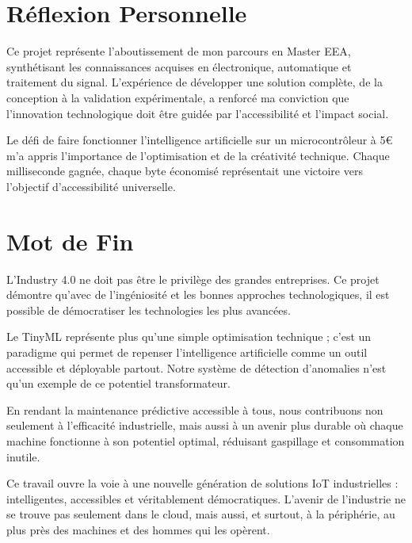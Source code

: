 \section*{Réflexion Personnelle}

Ce projet représente l'aboutissement de mon parcours en Master EEA, synthétisant les connaissances acquises en électronique, automatique et traitement du signal. L'expérience de développer une solution complète, de la conception à la validation expérimentale, a renforcé ma conviction que l'innovation technologique doit être guidée par l'accessibilité et l'impact social.

Le défi de faire fonctionner l'intelligence artificielle sur un microcontrôleur à 5€ m'a appris l'importance de l'optimisation et de la créativité technique. Chaque milliseconde gagnée, chaque byte économisé représentait une victoire vers l'objectif d'accessibilité universelle.

\section*{Mot de Fin}

L'Industry 4.0 ne doit pas être le privilège des grandes entreprises. Ce projet démontre qu'avec de l'ingéniosité et les bonnes approches technologiques, il est possible de démocratiser les technologies les plus avancées.

Le TinyML représente plus qu'une simple optimisation technique ; c'est un paradigme qui permet de repenser l'intelligence artificielle comme un outil accessible et déployable partout. Notre système de détection d'anomalies n'est qu'un exemple de ce potentiel transformateur.

En rendant la maintenance prédictive accessible à tous, nous contribuons non seulement à l'efficacité industrielle, mais aussi à un avenir plus durable où chaque machine fonctionne à son potentiel optimal, réduisant gaspillage et consommation inutile.

Ce travail ouvre la voie à une nouvelle génération de solutions IoT industrielles : intelligentes, accessibles et véritablement démocratiques. L'avenir de l'industrie ne se trouve pas seulement dans le cloud, mais aussi, et surtout, à la périphérie, au plus près des machines et des hommes qui les opèrent.